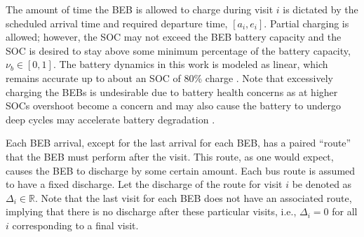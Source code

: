 \documentclass[energies,article,submit,moreauthors]{Definitions/mdpi}
\begin{document}
The amount of time the BEB is allowed to charge during visit \(i\) is dictated by the scheduled arrival time and required
departure time, \([a_i, e_i]\). Partial charging is allowed; however, the SOC may not exceed the BEB battery capacity and
the SOC is desired to stay above some minimum percentage of the battery capacity, \(\nu_b \in [0,1]\). The battery dynamics in
this work is modeled as linear, which remains accurate up to about an SOC of 80\% charge \cite{liu-2020-batter-elect}.
Note that excessively charging the BEBs is undesirable due to battery health concerns as at higher SOCs overshoot become
a concern and may also cause the battery to undergo deep cycles may accelerate battery degradation
\cite{edge-2021-lithium,millner-2010-model-lithium}.

Each BEB arrival, except for the last arrival for each BEB, has a paired ``route'' that the BEB must perform after the
visit. This route, as one would expect, causes the BEB to discharge by some certain amount. Each bus route is assumed to
have a fixed discharge. Let the discharge of the route for visit \(i\) be denoted as \(\Delta_i \in \mathbb{R}\). Note that the last visit
for each BEB does not have an associated route, implying that there is no discharge after these particular visits, i.e.,
\(\Delta_i = 0\) for all \(i\) corresponding to a final visit.
\end{document}
